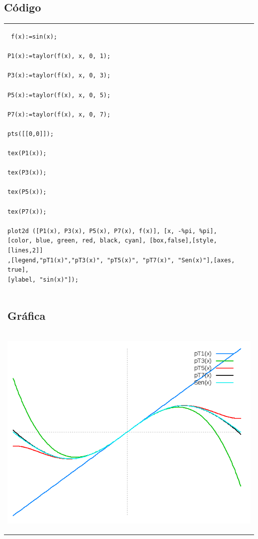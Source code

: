 \documentclass[10pt]{article}
\begin{document}
\subsection{Código}
\begin{tabular}{l}
\begin{verbatim}  
 f(x):=sin(x);

P1(x):=taylor(f(x), x, 0, 1);

P3(x):=taylor(f(x), x, 0, 3);

P5(x):=taylor(f(x), x, 0, 5);

P7(x):=taylor(f(x), x, 0, 7);

pts([[0,0]]);

tex(P1(x));

tex(P3(x));

tex(P5(x));

tex(P7(x));

plot2d ([P1(x), P3(x), P5(x), P7(x), f(x)], [x, -%pi, %pi],
[color, blue, green, red, black, cyan], [box,false],[style,[lines,2]]
,[legend,"pT1(x)","pT3(x)", "pT5(x)", "pT7(x)", "Sen(x)"],[axes, true],
[ylabel, "sin(x)"]);
\end{verbatim} \\
\subsection{Gráfica}\\
\begin{center}
  
    \includegraphics[scale=0.4]{sinx}
\end{center}
\end{tabular}
\end{document}
